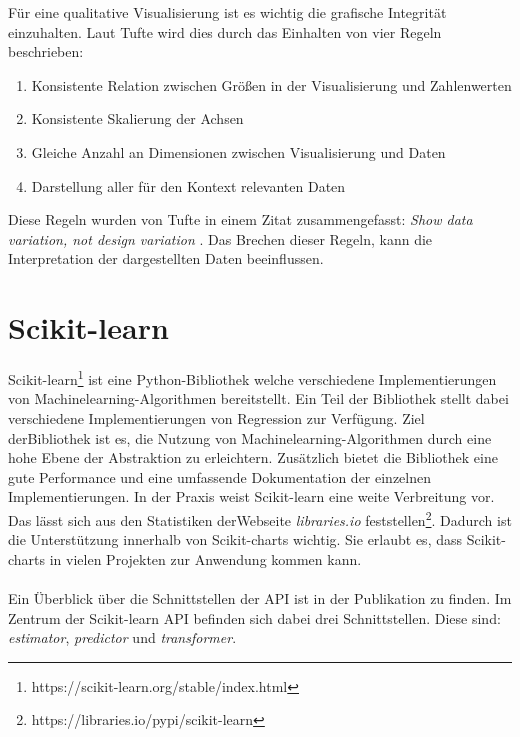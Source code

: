 \noindent Für eine qualitative Visualisierung ist es wichtig die grafische Integrität einzuhalten. Laut Tufte wird dies durch das Einhalten von vier Regeln beschrieben:
\begin{enumerate}
    \item Konsistente Relation zwischen Größen in der Visualisierung und Zahlenwerten
    \item Konsistente Skalierung der Achsen
    \item Gleiche Anzahl an Dimensionen zwischen Visualisierung und Daten
    \item Darstellung aller für den Kontext relevanten Daten
\end{enumerate}

\noindent Diese Regeln wurden von Tufte in einem Zitat zusammengefasst: \emph{Show data variation, not design variation} \parencite{TufteEdward}. Das Brechen dieser Regeln, kann die Interpretation der dargestellten Daten beeinflussen.



\section{Scikit-learn}
\label{sec:scikit-learn}

Scikit-learn\footnote{https://scikit-learn.org/stable/index.html} \parencite{scikit-learn} ist eine Python-Bibliothek welche verschiedene Implementierungen von Machinelearning-Algorithmen bereitstellt. Ein Teil der Bibliothek stellt dabei verschiedene Implementierungen von Regression zur Verfügung. Ziel der\linebreak Bibliothek ist es, die Nutzung von Machinelearning-Algorithmen durch eine hohe Ebene der Abstraktion zu erleichtern. Zusätzlich bietet die Bibliothek eine gute Performance und eine umfassende Dokumentation der einzelnen Implementierungen. In der Praxis weist Scikit-learn eine weite Verbreitung vor. Das lässt sich aus den Statistiken der\linebreak Webseite \emph{libraries.io} feststellen\footnote{https://libraries.io/pypi/scikit-learn}. Dadurch ist die Unterstützung innerhalb von \linebreak Scikit-charts wichtig. Sie erlaubt es, dass Scikit-charts in vielen Projekten zur Anwendung kommen kann.\\\\
\noindent Ein Überblick über die Schnittstellen der API ist in der Publikation \cite{sklearn_api} zu finden. Im Zentrum der Scikit-learn API befinden sich dabei drei Schnittstellen. Diese sind: \emph{estimator}, \emph{predictor} und \emph{transformer}.

